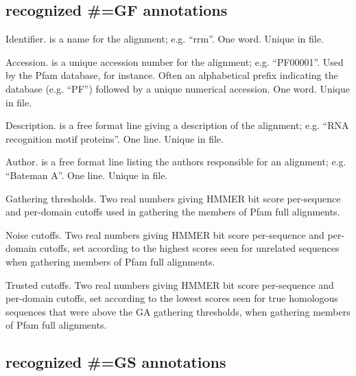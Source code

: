 \subsection{recognized \#=GF annotations}
\begin{sreitems}{}
\item [\monob{ID  <s>}] 
        Identifier.  is a name for the alignment;
        e.g. ``rrm''. One word. Unique in file.

\item [\monob{AC  <s>}]
        Accession.  is a unique accession number for the
        alignment; e.g. 
        ``PF00001''. Used by the Pfam database, for instance. 
        Often an alphabetical prefix indicating the database
        (e.g. ``PF'') followed by a unique numerical accession.
        One word. Unique in file. 
        
\item [\monob{DE  <s>}]
        Description.  is a free format line giving
        a description of the alignment; e.g.
        ``RNA recognition motif proteins''. One line. Unique in file.

\item [\monob{AU  <s>}]
        Author.  is a free format line listing the 
        authors responsible for an alignment; e.g. 
        ``Bateman A''. One line. Unique in file.

\item [\monob{GA  <f> <f>}]
        Gathering thresholds. Two real numbers giving HMMER bit score
        per-sequence and per-domain cutoffs used in gathering the
        members of Pfam full alignments. 
        
\item [\monob{NC  <f> <f>}]
        Noise cutoffs. Two real numbers giving HMMER bit score
        per-sequence and per-domain cutoffs, set according to the
        highest scores seen for unrelated sequences when gathering
        members of Pfam full alignments.

\item [\monob{TC  <f> <f>}]
        Trusted cutoffs. Two real numbers giving HMMER bit score
        per-sequence and per-domain cutoffs, set according to the
        lowest scores seen for true homologous sequences that
        were above the GA gathering thresholds, when gathering
        members of Pfam full alignments. 
\end{sreitems}

\subsection{recognized \#=GS annotations}

